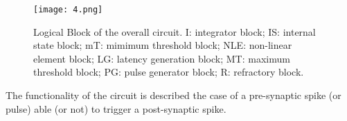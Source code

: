 \documentclass[review]{elsarticle}
\begin{document}
\begin{figure}[!htbp]
\centering
\texttt{[image: 4.png]}
\caption{Logical Block of the overall circuit. I: integrator block; IS: internal state block; mT: mimimum threshold block; NLE: non-linear element block; LG: latency generation block; MT: maximum threshold block; PG: pulse generator block; R: refractory block.}
\label{Neuron Logic Diagram}
\end{figure}


%
%
%
%
%
%
%
% 
%

The functionality of the circuit is described the case of a pre-synaptic spike (or pulse) able (or not) to trigger a post-synaptic spike.
\end{document}
